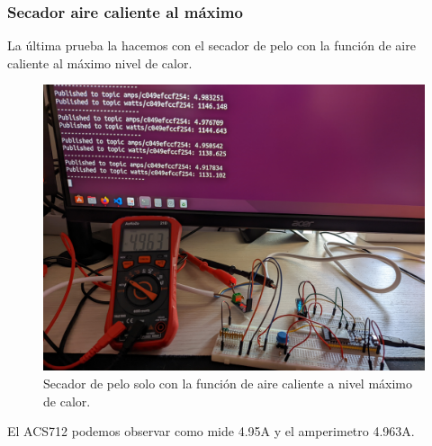 \begin{titlepage}
\subsubsection{Secador aire caliente al máximo}
La última prueba la hacemos con el secador de pelo con la función de aire caliente al máximo nivel de calor.\\
\begin{figure}[h!]
	\centering
	\includegraphics[width=1\textwidth]{imagenes/AC_4_9Amps.jpg}
	\caption{Secador de pelo solo con la función de aire caliente a nivel máximo de calor.}
\end{figure}
El ACS712 podemos observar como mide 4.95A y el amperimetro 4.963A.\\
\end{titlepage}
